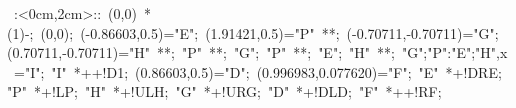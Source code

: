 %


\hbox{
\xy    <2cm,0cm>:<0cm,2cm>::
       (0,0) *\ellipse(1){-}; (0,0); 
       (-0.86603,0.5)="E"; (1.91421,0.5)="P" **\dir{-}; 
       (-0.70711,-0.70711)="G"; (0.70711,-0.70711)="H" **\dir{-}; "P" **\dir{-};
       "G"; "P" **\dir{-}; "E"; "H" **\dir{-}; 
       {"G";"P":"E";"H",x} ="I";  "I" *++!D{1};
       (0.86603,0.5)="D"; (0.996983,0.077620)="F"; 
       "E" *+!DR{E};
       "P" *+!L{P};
       "H" *+!UL{H};
       "G" *+!UR{G};
       "D" *+!DL{D};
       "F" *++!R{F};
\endxy}

